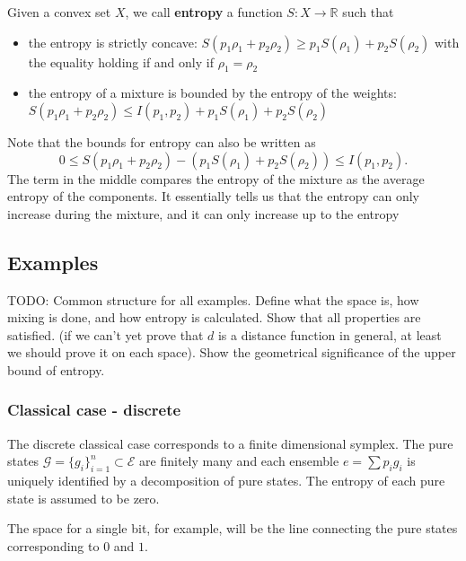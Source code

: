\documentclass[11pt]{article}
\begin{document}
\begin{defn}
	Given a convex set $X$, we call \textbf{entropy} a function $S : X \to \mathbb{R}$ such that
	\begin{itemize}
		\item the entropy is strictly concave: $S(p_1\rho_1 + p_2 \rho_2) \geq p_1 S(\rho_1) + p_2 S(\rho_2)$ with the equality holding if and only if $\rho_1 = \rho_2$
		\item the entropy of a mixture is bounded by the entropy of the weights: $S(p_1\rho_1 + p_2 \rho_2) \leq I(p_1, p_2) + p_1 S(\rho_1) + p_2 S(\rho_2)$
	\end{itemize}
\end{defn}

\begin{remark}
	Note that the bounds for entropy can also be written as
	$$ 0 \leq S(p_1\rho_1 + p_2 \rho_2) - (p_1 S(\rho_1) + p_2 S(\rho_2)) \leq I(p_1, p_2).$$
	The term in the middle compares the entropy of the mixture as the average entropy of the components. It essentially tells us that the entropy can only increase during the mixture, and it can only increase up to the entropy 
\end{remark}

\subsection{Examples}

TODO: Common structure for all examples. Define what the space is, how mixing is done, and how entropy is calculated. Show that all properties are satisfied. (if we can't yet prove that $d$ is a distance function in general, at least we should prove it on each space). Show the geometrical significance of the upper bound of entropy.

\subsubsection{Classical case - discrete}

The discrete classical case corresponds to a finite dimensional symplex. The pure states $\mathcal{G} = \{g_i\}_{i=1}^{n} \subset \mathcal{E}$ are finitely many and each ensemble $e = \sum p_i g_i$ is uniquely identified by a decomposition of pure states. The entropy of each pure state is assumed to be zero.

The space for a single bit, for example, will be the line connecting the  pure states corresponding to $0$ and $1$.
\end{document}
